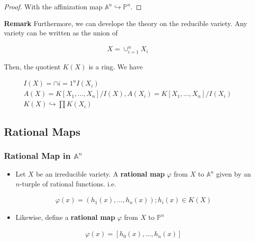 \documentclass[Total.tex]{subfiles}
\begin{document}
		\begin{proof}
			With the affinization map $\mathbb{A}^n\hookrightarrow \mathbb{P}^n$.
		\end{proof}
		
		\textbf{Remark} Furthermore, we can develope the theory on the reducible variety. Any variety can be written as the union of
		
		\begin{gather*}
			X=\cup_{i=1}^n X_i
		\end{gather*}
		
		Then, the quotient $K(X)$ is a ring. We have
		
		\begin{gather*}
			I(X)=\cap{i=1}^n I(X_i)\\
			A(X)=K[X_1,\dots,X_n]/I(X),A(X_i)=K[X_1,\dots,X_n]/I(X_i)\\
			K(X)\hookrightarrow \prod K(X_i)
		\end{gather*}
		
		
		
		
		\subsection{Rational Maps}
		
		\subsubsection{Rational Map in $\mathbb{A}^n$}
		
		\begin{Def}
			\begin{itemize}
				\item Let $X$ be an irreducible variety. A \textbf{rational map} $\varphi$ from $X$ to $\mathbb{A}^n$ given by an $n$-turple of rational functions. i.e.
				
				\begin{gather*}
					\varphi(x)=(h_1(x),\dots,h_n(x));h_i(x)\in K(X)
				\end{gather*}
				
				
				
				\item Likewise, define a \textbf{rational map} $\varphi$ from $X$ to $\mathbb{P}^n$
				
				\begin{gather*}
					\varphi(x)=[h_0(x),\dots,h_n(x)]
				\end{gather*}
			\end{itemize}
		\end{Def}
		
\end{document}
